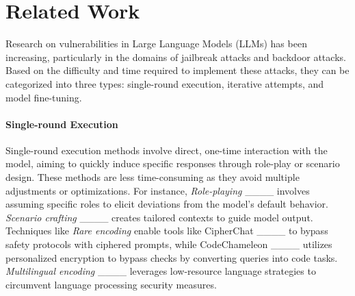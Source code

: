 \section{Related Work}
Research on vulnerabilities in Large Language Models (LLMs) has been increasing, particularly in the domains of jailbreak attacks and backdoor attacks. Based on the difficulty and time required to implement these attacks, they can be categorized into three types: single-round execution, iterative attempts, and model fine-tuning.


\paragraph{Single-round Execution} Single-round execution methods involve direct, one-time interaction with the model, aiming to quickly induce specific responses through role-play or scenario design. These methods are less time-consuming as they avoid multiple adjustments or optimizations. For instance, \textit{Role-playing} ____ involves assuming specific roles to elicit deviations from the model's default behavior. \textit{Scenario crafting} ____ creates tailored contexts to guide model output. Techniques like \textit{Rare encoding} enable tools like CipherChat ____ to bypass safety protocols with ciphered prompts, while CodeChameleon ____ utilizes personalized encryption to bypass checks by converting queries into code tasks. \textit{Multilingual encoding} ____ leverages low-resource language strategies to circumvent language processing security measures.

